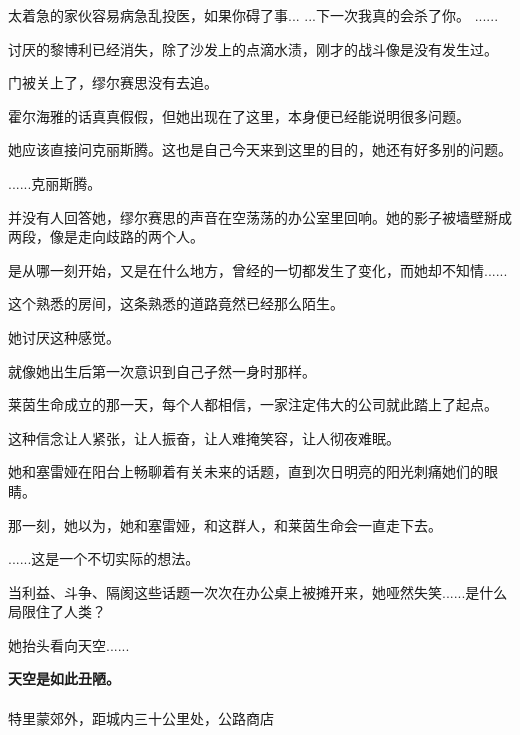 \documentclass[openany]{book}
\begin{document}
\begin{dialogue}
     太着急的家伙容易病急乱投医，如果你碍了事...
     ...下一次我真的会杀了你。
     ......
\end{dialogue}
\par
讨厌的黎博利已经消失，除了沙发上的点滴水渍，刚才的战斗像是没有发生过。\par
门被关上了，缪尔赛思没有去追。\par
霍尔海雅的话真真假假，但她出现在了这里，本身便已经能说明很多问题。\par
她应该直接问克丽斯腾。这也是自己今天来到这里的目的，她还有好多别的问题。\par
\begin{dialogue}
     ......克丽斯腾。
\end{dialogue}
\par
并没有人回答她，缪尔赛思的声音在空荡荡的办公室里回响。她的影子被墙壁掰成两段，像是走向歧路的两个人。\par
是从哪一刻开始，又是在什么地方，曾经的一切都发生了变化，而她却不知情......\par
这个熟悉的房间，这条熟悉的道路竟然已经那么陌生。\par
她讨厌这种感觉。\par
就像她出生后第一次意识到自己孑然一身时那样。\par
莱茵生命成立的那一天，每个人都相信，一家注定伟大的公司就此踏上了起点。\par
这种信念让人紧张，让人振奋，让人难掩笑容，让人彻夜难眠。\par
她和塞雷娅在阳台上畅聊着有关未来的话题，直到次日明亮的阳光刺痛她们的眼睛。\par
那一刻，她以为，她和塞雷娅，和这群人，和莱茵生命会一直走下去。\par
......这是一个不切实际的想法。\par
当利益、斗争、隔阂这些话题一次次在办公桌上被摊开来，她哑然失笑......是什么局限住了人类？\par
她抬头看向天空......\par
\textbf{天空是如此丑陋。}
\\
\\
特里蒙郊外，距城内三十公里处，公路商店\par
\end{document}
